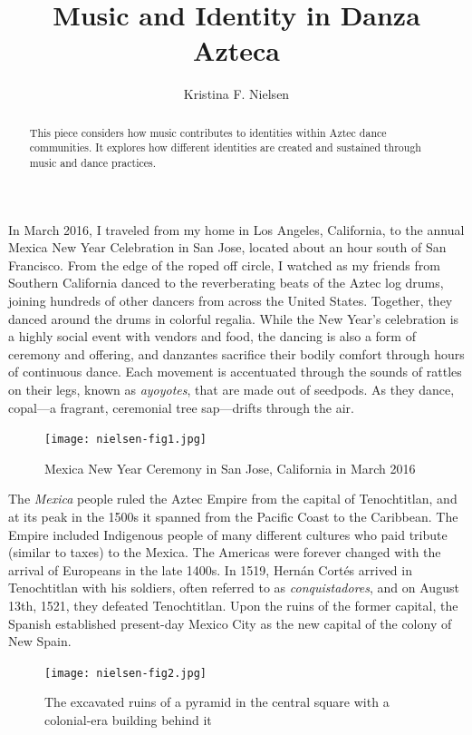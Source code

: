 \documentclass{scrartcl}
\title{Music and Identity in Danza Azteca}
\author{Kristina F. Nielsen}
\affil{Assistant Professor of Musicology\\Southern Methodist University}
\date{}
\begin{document}
\maketitle

\begin{abstract}
  This piece considers how music contributes to identities within Aztec dance communities. It explores how different identities are created and sustained through music and dance practices.
\end{abstract}

In March 2016, I traveled from my home in Los Angeles, California, to
the annual Mexica New Year Celebration in San Jose, located about an
hour south of San Francisco. From the edge of the roped off circle, I
watched as my friends from Southern California danced to the
reverberating beats of the Aztec log drums, joining hundreds of other
dancers from across the United States. Together, they danced around the
drums in colorful regalia. While the New Year's celebration is a highly
social event with vendors and food, the dancing is also a form of
ceremony and offering, and danzantes sacrifice their bodily comfort
through hours of continuous dance. Each movement is accentuated through
the sounds of rattles on their legs, known as \emph{ayoyotes}, that are
made out of seedpods. As they dance, copal---a fragrant, ceremonial tree
sap---drifts through the air.

\begin{figure}
  \texttt{[image: nielsen-fig1.jpg]}
  \caption{Mexica New Year Ceremony in San Jose, California in March 2016}
\end{figure}

The \emph{Mexica} people ruled the Aztec Empire from the capital of
Tenochtitlan, and at its peak in the 1500s it spanned from the Pacific
Coast to the Caribbean. The Empire included Indigenous people of many
different cultures who paid tribute (similar to taxes) to the Mexica.
The Americas were forever changed with the arrival of Europeans in the
late 1400s. In 1519, Hernán Cortés arrived in Tenochtitlan with his
soldiers, often referred to as \emph{conquistadores}, and on August
13th, 1521, they defeated Tenochtitlan. Upon the ruins of the former
capital, the Spanish established present-day Mexico City as the new
capital of the colony of New Spain.

\begin{figure}
  \texttt{[image: nielsen-fig2.jpg]}
  \caption{The excavated ruins of a pyramid in the central square with a colonial-era building behind it}
\end{figure}
\end{document}

